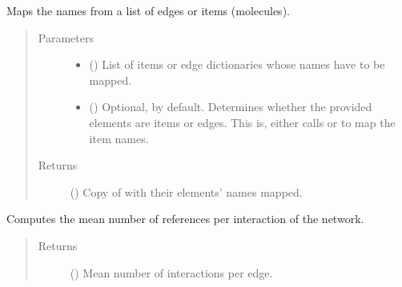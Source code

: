 \documentclass[letterpaper,10pt,english]{sphinxmanual}
\begin{document}
\begin{fulllineitems}
\begin{fulllineitems}
\end{fulllineitems}


\begin{fulllineitems}
\label{\detokenize{main:pypath.main.PyPath.map_list}}
Maps the names from a list of edges or items (molecules).
\begin{quote}\begin{description}
\item[{Parameters}] \leavevmode\begin{itemize}
\item {} 
 () \textendash{} List of items or edge dictionaries whose names have to be
mapped.

\item {} 
 () \textendash{} Optional,  by default. Determines whether the
provided elements are items or edges. This is, either calls
{\hyperref[\detokenize{main:pypath.main.PyPath.map_edge}]{}} or
{\hyperref[\detokenize{main:pypath.main.PyPath.map_item}]{}} to map the item
names.

\end{itemize}

\item[{Returns}] \leavevmode
() \textendash{} Copy of  with their elements’ names mapped.

\end{description}\end{quote}

\end{fulllineitems}


\begin{fulllineitems}
\label{\detokenize{main:pypath.main.PyPath.mean_reference_per_interaction}}
Computes the mean number of references per interaction of the
network.
\begin{quote}\begin{description}
\item[{Returns}] \leavevmode
() \textendash{} Mean number of interactions per edge.


\end{description}
\end{quote}
\end{fulllineitems}
\end{fulllineitems}
\end{document}
